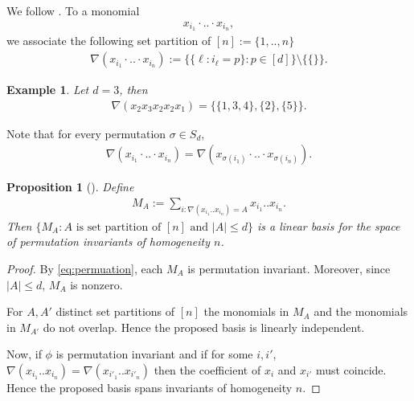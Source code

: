 \documentclass{scrartcl}
\theoremstyle{plain}
\newtheorem{example}[theorem]{Example}
\newtheorem{proposition}[theorem]{Proposition}
\newtheorem{remark}[theorem]{Remark}
\theoremstyle{definition}
\newcommand{\1}[1]{1_{\{#1\}}}
\newcommand{\ds}{d} %
\begin{document}
  
We follow \cite[Section 3]{bib:BRRZ2005}.
%
To a monomial
\begin{align*}
  x_{i_1}\cdot .. \cdot x_{i_n},
\end{align*}
we associate the following set partition  of $[n] := \{1, .., n \}$
\begin{align*}
  \nabla(  x_{i_1} \cdot .. \cdot x_{i_n} )
  :=
  \{ \{ \ell : i_\ell = p \} : p \in [d] \} \setminus \{ \{ \} \}.
\end{align*}

\begin{example}
  Let $d=3$, then
  \begin{align*}
    \nabla(  x_2 x_3 x_2 x_2 x_1 )
    =
    \{ \{1, 3, 4\}, \{2\}, \{5\} \}.
  \end{align*}
\end{example}

Note that for every permutation $\sigma \in S_\ds$,
\begin{align}
  \label{eq:permuation}
  \nabla( x_{i_1}\cdot .. \cdot x_{i_n} ) = \nabla( x_{\sigma(i_1)} \cdot .. \cdot x_{\sigma(i_n)} ).
\end{align}

\begin{proposition}[{\cite[Section 3]{bib:BRRZ2005}}]
  \label{prop:permInvariants}
  Define
  \begin{align*}
    M_A := \sum_{i: \nabla( x_{i_1} .. x_{i_n} ) = A} x_{i_1} .. x_{i_n}.
  \end{align*}
  Then $\{ M_A : A \text{ is set partition of } [n] \text{ and } |A| \le \ds \}$ is a linear basis for the space of permutation invariants of homogeneity $n$.
\end{proposition}
\begin{proof}
  By \eqref{eq:permuation}, each $M_A$ is permutation invariant.
  Moreover, since $|A| \le \ds$, $M_A$ is nonzero.

  For $A, A'$ distinct set partitions of $[n]$
  the monomials in $M_A$ and the monomials in $M_{A'}$ do not overlap.
  Hence the proposed basis is linearly independent.

  Now, if $\phi$ is permutation invariant
  and if for some $i, i'$,
  $\nabla( x_{i_1} .. x_{i_n} ) = \nabla( x_{i'_1} .. x_{i'_n} )$ then
  the coefficient of $x_i$ and $x_{i'}$ must coincide.
  Hence the proposed basis spans invariants of homogeneity $n$.
\end{proof}
\end{document}
